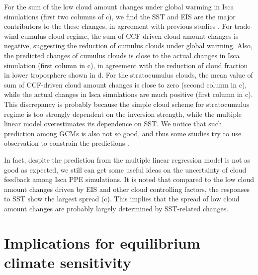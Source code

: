 For the sum of the low cloud amount changes under global warming in Isca simulations (first two columns of c), we find the SST and EIS are the major contributors to the these changes, in agreement with previous studies \citep{Myers2015relationships,Myers2016,Qu2015positive,Seethala2015,Zhou2015,McCoy2016relationships}. For trade-wind cumulus cloud regime, the sum of CCF-driven cloud amount changes is negative, suggesting the reduction of cumulus clouds under global warming. Also, the predicted changes of cumulus clouds is close to the actual changes in Isca simulation (first column in c), in agreement with the reduction of cloud fraction in lower troposphere shown in d. For the stratocumulus clouds, the mean value of sum of CCF-driven cloud amount changes is close to zero (second column in c), while the actual changes in Isca simulations are much positive (first column in c). This discrepancy is probably because the simple cloud scheme for stratocumulus regime is too strongly dependent on the inversion strength, while the multiple linear model overestimates its dependence on SST. We notice that such prediction among GCMs is also not so good, and thus some studies try to use observation to constrain the predictions \citep{Myers2016,Myers2021}. 

In fact, despite the prediction from the multiple linear regression model is not as good as expected, we still can get some useful ideas on the uncertainty of cloud feedback among Isca PPE simulations. It is noted that compared to the low cloud amount changes driven by EIS and other cloud controlling factors, the responses to SST show the largest spread (c). This implies that the spread of low cloud amount changes are probably largely determined by SST-related changes. %

\section{Implications for equilibrium climate sensitivity}
\label{sec:implification_for_ECS}


